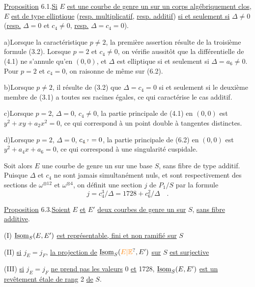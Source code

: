 \uline{Proposition} 6.1.\qquad \uline{Si} $E$ \uline{est une courbe de genre un sur un corps algébriquement clos}, $E$ \uline{est de type elliptique} (\uline{resp. multiplicatif}, \uline{resp. additif}) \uline{si et seulement si} $\Delta\ne0$ (\uline{resp.} $\Delta=0$ et $c_4\ne0$, \uline{resp.} $\Delta=c_4=0$).

a)\qquad Lorsque la caractéristique $p\ne2$, la première assertion résulte de la troisième formule (3.2). Lorsque $p=2$ et $c_4\ne0$, on vérifie aussitôt que la différentielle de (4.1) ne s'annule qu'en $(0,0)$, et $\Delta$ est elliptique si et seulement si $\Delta=a_6\ne0$. Pour $p=2$ et $c_4=0$, on raisonne de même sur (6.2).

b)\qquad Lorsque $p\ne2$, il résulte de (3.2) que $\Delta=c_4=0$ si et seulement si le deuxième membre de (3.1) a toutes ses racines égales, ce qui caractérise le cas additif.

c)\qquad Lorsque $p=2$, $\Delta=0$, $c_4\ne0$, la partie principale de (4.1) en $(0,0)$ est $y^2+xy+a_2x^2=0$, ce qui correspond à un point double à tangentes distinctes.

d)\qquad Lorsque $p=2$, $\Delta=0$, $c_{4\unsure{.}}=0$, la partie principale de (6.2) en $(0,0)$ est $y^2+a_4x+a_6=0$, ce qui correspond à une singularité cuspidale.

Soit alors $E$ une courbe de genre un sur une base $S$, sans fibre de type additif. Puisque $\Delta$ et $c_4$ ne sont jamais simultanément nuls, et sont respectivement des sections de $\omega^{\otimes12}$ et $\omega^{\otimes4}$, on définit une section $j$ de $P_1/S$ par la formule
\[
j=c_4^3/\Delta=1728+c_6^2/\Delta\quad .\tag*{(6.2)}
\]

\uline{Proposition} 6.3.\qquad \uline{Soient} $E$ \uline{et} $E'$ \uline{deux courbes de genre un sur} $S$, \uline{sans fibre additive}.

(I) $\underline{\mathrm{Isom}}_{S}(E,E')$ \uline{est représentable, fini et non ramifié sur} $S$

(II) \uline{si} $j_E=j_F$, \uline{la projection de} $\underline{\mathrm{Isom}}_{\handwritten{S}}(\unsure{E|\mathbb E},E')$ \uline{sur} $S$ \uline{est surjective}

(III) \uline{si} $j_E=j_F$ \uline{ne prend pas les valeurs} 0 \uline{et} 1728, $\underline{\mathrm{Isom}}_{S}(E,E')$ \uline{est un revêtement étale de rang} 2 \uline{de} $S$.

